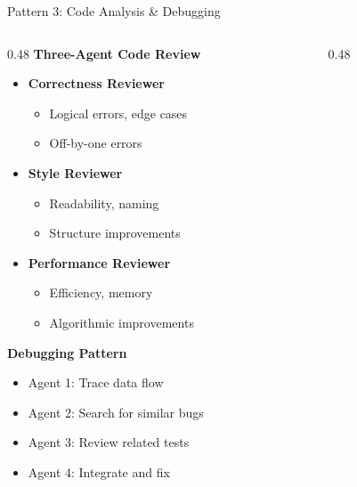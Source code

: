 \documentclass[aspectratio=169,11pt]{beamer}
\begin{document}
\begin{frame}{Pattern 3: Code Analysis \& Debugging}
    \begin{columns}[T]
        \begin{column}{0.48\textwidth}
            \textbf{Three-Agent Code Review}
            \begin{itemize}
                \item \textcolor{UofSCGarnet}{\textbf{Correctness Reviewer}}
                    \begin{itemize}
                        \footnotesize
                        \item Logical errors, edge cases
                        \item Off-by-one errors
                    \end{itemize}
                \item \textcolor{UofSCAtlantic}{\textbf{Style Reviewer}}
                    \begin{itemize}
                        \footnotesize
                        \item Readability, naming
                        \item Structure improvements
                    \end{itemize}
                \item \textcolor{UofSCCongaree}{\textbf{Performance Reviewer}}
                    \begin{itemize}
                        \footnotesize
                        \item Efficiency, memory
                        \item Algorithmic improvements
                    \end{itemize}
            \end{itemize}

            \vspace{0.3cm}
            \textbf{Debugging Pattern}
            \begin{itemize}
                \footnotesize
                \item Agent 1: Trace data flow
                \item Agent 2: Search for similar bugs
                \item Agent 3: Review related tests
                \item Agent 4: Integrate and fix
            \end{itemize}
        \end{column}
        \begin{column}{0.48\textwidth}
\end{column}
\end{columns}
\end{frame}
\end{document}
